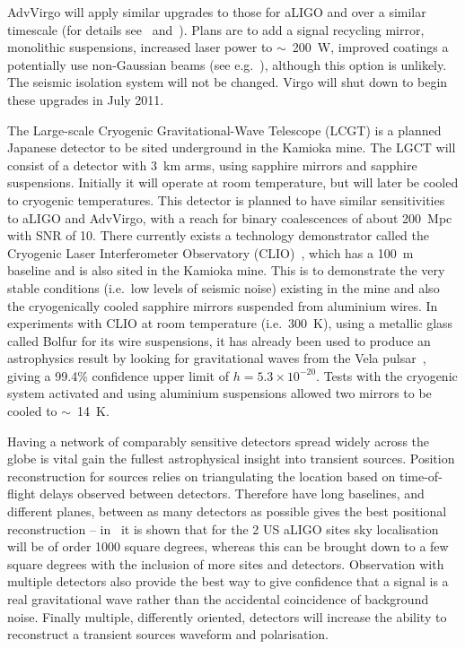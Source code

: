 \documentclass{article}
\begin{document}
AdvVirgo will apply similar upgrades to those for aLIGO and over a similar
timescale (for details see~\cite{AdVwhitepaper} and~\cite{AdVdesign}). Plans are
to add a signal recycling mirror, monolithic suspensions, increased laser power
to $\sim$~200~W, improved coatings a potentially use non-Gaussian beams (see
e.g.~\cite{Freise:2010}), although this option is unlikely. The seismic isolation
system will not be changed. Virgo will shut down to begin these upgrades in July
2011.

The Large-scale Cryogenic Gravitational-Wave Telescope (LCGT)
\cite{Miyoki:2005, Ohashi:2008, Kuroda:2010} is a planned Japanese detector to
be sited underground in the Kamioka mine. The LGCT will consist of a detector
with 3~km arms, using sapphire mirrors and sapphire suspensions. Initially it
will operate at room temperature, but will later be cooled to cryogenic
temperatures. This detector is planned to have similar sensitivities
to aLIGO and AdvVirgo, with a reach for binary coalescences of about 200~Mpc
with SNR of 10. There currently exists a technology demonstrator called the
Cryogenic Laser Interferometer Observatory (CLIO)~\cite{Yamamoto:2008, CLIOweb},
which has a 100~m baseline and is also sited in the Kamioka mine. This is to
demonstrate the very stable conditions (i.e.\ low levels of seismic noise)
existing in the mine and also the cryogenically cooled sapphire mirrors
suspended from aluminium wires. In experiments with CLIO at room temperature
(i.e.\ 300~K), using a metallic glass called Bolfur for its wire suspensions, it
has already been used to produce an astrophysics result by looking for
gravitational waves from the Vela pulsar~\cite{Akutsu:2008}, giving a 99.4\%
confidence upper limit of $h = 5.3\times10^{-20}$. Tests with the cryogenic
system activated and using aluminium suspensions allowed two mirrors to be
cooled to $\sim$~14~K.

Having a network of comparably sensitive detectors spread widely across the
globe is vital gain the fullest astrophysical insight into transient sources.
Position reconstruction for sources relies on triangulating the location based
on time-of-flight delays observed between detectors. Therefore have long
baselines, and different planes, between as many detectors as possible gives the
best positional reconstruction -- in~\cite{Fairhurst:2010} it is shown that for
the 2 US aLIGO sites sky localisation will be of order 1000 square degrees,
whereas this can be brought down to a few square degrees with the inclusion of
more sites and detectors. Observation with multiple detectors also provide the
best way to give confidence that a signal is a real gravitational wave rather
than the accidental coincidence of background noise. Finally multiple,
differently oriented, detectors will increase the ability to reconstruct a
transient sources waveform and polarisation.
\end{document}
